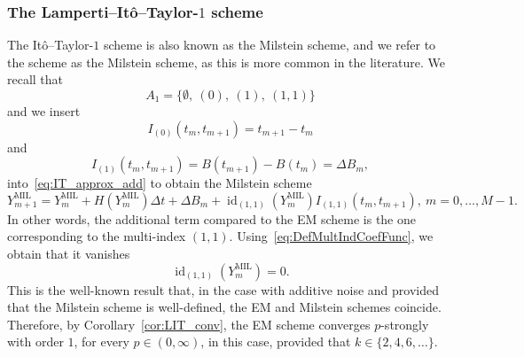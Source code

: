 \documentclass[11pt]{amsart}
\newcommand{\MIL}{\textrm{MIL}}
\newcommand{\id}{\operatorname{id}}
\begin{document}
{\subsubsection{The Lamperti--Itô--Taylor-$1$ scheme}\label{sec:Lamperti_Milstein}
The Itô--Taylor-$1$ scheme is also known as the Milstein scheme, and we refer to the scheme as the Milstein scheme, as this is more common in the literature. We recall that 
\begin{equation*}
A_{1} = \{ \emptyset,\ (0),\ (1),\ (1,1) \}
\end{equation*}
and we insert
\begin{equation*}
I_{(0)}(t_{m},t_{m+1}) = t_{m+1} - t_{m}
\end{equation*}
and
\begin{equation*}
I_{(1)}(t_{m},t_{m+1}) = B(t_{m+1}) - B(t_{m}) = \Delta B_{m},
\end{equation*}
into~\eqref{eq:IT_approx_add} to obtain the Milstein scheme
\begin{equation*}
Y^{\MIL}_{m+1} = Y^{\MIL}_{m} + H(Y^{\MIL}_{m}) \Delta t + \Delta B_{m} + \id_{(1,1)}(Y^{\MIL}_{m}) I_{(1,1)}(t_{m},t_{m+1}),\ m=0,\ldots,M-1.
\end{equation*}
In other words, the additional term compared to the EM scheme is the one corresponding to the multi-index $(1,1)$. Using~\eqref{eq:DefMultIndCoefFunc}, we obtain that it vanishes
\begin{equation*}
\id_{(1,1)}(Y^{\MIL}_{m}) = 0.
\end{equation*}
This is the well-known result that, in the case with additive noise and provided that the Milstein scheme is well-defined, the EM and Milstein schemes coincide. Therefore, by Corollary~\ref{cor:LIT_conv}, the EM scheme converges $p$-strongly with order $1$, for every $p \in (0,\infty)$, in this case, provided that $k \in \{2,4,6,\ldots \}$.

}
\end{document}
